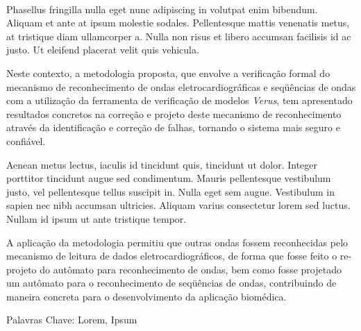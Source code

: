 \ \ \\[2cm]
Phasellus fringilla nulla eget nunc adipiscing in volutpat enim bibendum. 
Aliquam et ante at ipsum molestie sodales. Pellentesque mattis venenatis metus, 
at tristique diam ullamcorper a. Nulla non risus et libero accumsan facilisis 
id ac justo. Ut eleifend placerat velit quis vehicula. 

Neste contexto, a metodologia proposta, que envolve a verificação formal
do mecanismo de reconhecimento de ondas eletrocardiográficas e
seqüências de ondas com a utilização da ferramenta de verificação
de modelos {\em Verus}, tem apresentado resultados concretos na
correção e projeto deste mecanismo de reconhecimento através da
identificação e correção de falhas, tornando o sistema mais seguro e
confiável.

Aenean metus lectus, iaculis id tincidunt quis, 
tincidunt ut dolor. Integer porttitor tincidunt augue sed condimentum. Mauris pellentesque 
vestibulum justo, vel pellentesque tellus suscipit in. Nulla eget sem augue. 
Vestibulum in sapien nec nibh accumsan ultricies. Aliquam varius consectetur lorem sed luctus. 
Nullam id ipsum ut ante tristique tempor.

A aplicação da metodologia permitiu que outras ondas fossem
reconhecidas pelo mecanismo de leitura de dados
eletrocardiográficos, de forma que fosse feito o
re-projeto do autômato para reconhecimento de ondas, bem como
fosse projetado um autômato para o reconhecimento de seqüências
de ondas, contribuindo de maneira concreta para o desenvolvimento
da aplicação biomédica.


Palavras Chave: Lorem, Ipsum

